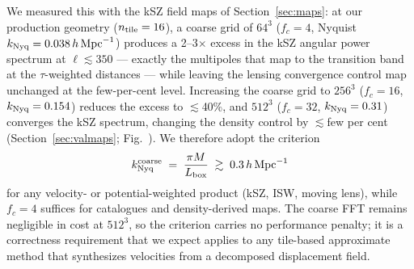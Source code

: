We measured this with the kSZ field maps of Section~\ref{sec:maps}: at our
production geometry ($n_{\rm tile}=16$), a coarse grid of $64^3$
($f_c=4$, Nyquist $k_{\rm Nyq}=0.038\,h\,{\rm Mpc}^{-1}$) produces a
2--3$\times$ excess in the kSZ angular power spectrum at $\ell\lesssim 350$
--- exactly the multipoles that map to the transition band at the
$\tau$-weighted distances --- while leaving the lensing convergence control
map unchanged at the few-per-cent level. Increasing the coarse grid to
$256^3$ ($f_c=16$, $k_{\rm Nyq}=0.154$) reduces the excess to
$\lesssim$40\%, and $512^3$ ($f_c=32$, $k_{\rm Nyq}=0.31$) converges the kSZ
spectrum, changing the density control by $\lesssim$few per cent
(Section~\ref{sec:valmaps}; Fig.~). We therefore adopt the criterion
\begin{equation}
  k_{\rm Nyq}^{\rm coarse} \;=\; \frac{\pi M}{L_{\rm box}}
  \;\gtrsim\; 0.3\,h\,{\rm Mpc}^{-1}
  \label{eq:cfrule}
\end{equation}
for any velocity- or potential-weighted product (kSZ, ISW, moving lens),
while $f_c=4$ suffices for catalogues and density-derived maps. The coarse
FFT remains negligible in cost at $512^3$, so the criterion carries no
performance penalty; it is a correctness requirement that we expect applies
to any tile-based approximate method that synthesizes velocities from a
decomposed displacement field.

